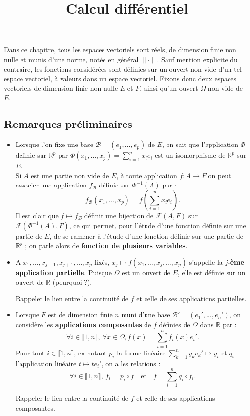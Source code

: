 \documentclass[french]{article}
\title{Calcul différentiel}
\date{}
\newcommand{\R}{\mathbb{R}}
\newcommand{\inv}{^{-1}}
\theoremstyle{plain}
\theoremstyle{definition}
\theoremstyle{remark}
\begin{document}
\tableofcontents

\newpage
\maketitle

Dans ce chapitre, tous les espaces vectoriels sont réels, de dimension finie non nulle et munis d'une norme, notée en général $\lVert\cdot\rVert$. Sauf mention explicite du contraire, les fonctions considérées sont définies sur un ouvert non vide d'un tel espace vectoriel, à valeurs dans un espace vectoriel. Fixons donc deux espaces vectoriels de dimension finie non nulle $E$ et $F$, ainsi qu'un ouvert $\Omega$ non vide de $E$.

\subsection*{Remarques préliminaires}

\begin{itemize}
	\item Lorsque l'on fixe une base $\mathcal{B}=(e_1,\ldots,e_p)$ de $E$, on sait que l'application $\Phi$ définie sur $\R^p$ par $\Phi(x_1,\ldots,x_p)=\displaystyle\sum_{i=1}^{p}x_ie_i$ est un isomorphisme de $\R^p$ sur $E$.\\
	Si $A$ est une partie non vide de $E$, à toute application $f:A\to F$ on peut associer une application $f_{\mathcal{B}}$ définie sur $\Phi\inv(A)$ par : 
	$$f_{\mathcal{B}}(x_1,\ldots,x_p)=f\left(\sum_{i=1}^{p}x_ie_i\right).$$
	Il est clair que $f\mapsto f_{\mathcal{B}}$ définit une bijection de $\mathcal{F}(A,F)$ sur $\mathcal{F}(\Phi\inv(A),F)$, ce qui permet, pour l'étude d'une fonction définie sur une partie de $E$, de se ramener à l'étude d'une fonction définie sur une partie de $\R^p$ ; on parle alors de \textbf{fonction de plusieurs variables}.
	\item A $x_1,\ldots,x_{j-1},x_{j+1},\ldots,x_p$ fixés, $x_j\mapsto f(x_1,\ldots,x_j,\ldots,x_p)$ s'appelle la \textbf{$j$-ème application partielle}. Puisque $\Omega$ est un ouvert de $E$, elle est définie sur un ouvert de $\R$ (pourquoi ?).
	\begin{exo}
		Rappeler le lien entre la continuité de $f$ et celle de ses applications partielles.
	\end{exo}
	\item Lorsque $F$ est de dimension finie $n$ muni d'une base $\mathcal{B}'=(e_1',\ldots,e_n')$, on considère les \textbf{applications composantes} de $f$ définies de $\Omega$ dans $\R$ par :
	$$\forall i\in\llbracket1,n\rrbracket,\ \forall x\in\Omega, f(x)=\sum_{i=1}^{n}f_i(x)e_i'.$$
	Pour tout $i\in\llbracket1,n\rrbracket$, en notant $p_i$ la forme linéaire $\displaystyle\sum_{k=1}^{n}y_ke_k'\mapsto y_i$ et $q_i$ l'application linéaire $t\mapsto te_i'$, on a les relations :
	$$\forall i\in\llbracket1,n\rrbracket,\ f_i=p_i\circ f\quad\text{et}\quad f=\sum_{i=1}^{n}q_i\circ f_i.$$
	\begin{exo}
		Rappeler le lien entre la continuité de $f$ et celle de ses applications composantes.
	\end{exo}
\end{itemize}
\end{document}
